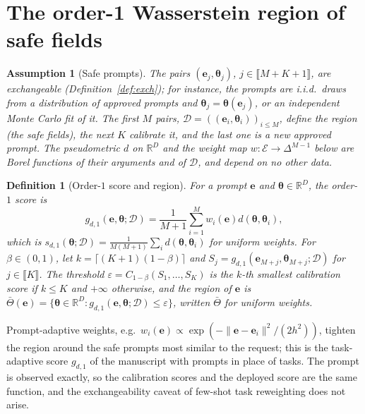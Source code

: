 \documentclass{article}
\newcommand{\RR}{\mathbb{R}}
\newcommand{\cD}{\mathcal{D}}
\newcommand{\cE}{\mathcal{E}}
\newcommand{\bth}{\boldsymbol{\theta}}
\newcommand{\be}{\mathbf{e}}
\newcommand{\Tbar}{\bar{\Theta}}
\theoremstyle{plain}
\newtheorem{definition}[theorem]{Definition}
\newtheorem{assumption}[theorem]{Assumption}
\theoremstyle{remark}
\begin{document}
\section{The order-1 Wasserstein region of safe fields}\label{sec:region}

\begin{assumption}[Safe prompts]\label{as:exch}
The pairs $(\be_j,\bth_j)$, $j\in\llbracket M+K+1\rrbracket$, are exchangeable (Definition~\ref{def:exch}); for instance, the prompts are
i.i.d.\ draws from a distribution of approved prompts and $\bth_j=\bth(\be_j)$, or an independent
Monte Carlo fit of it. The first $M$ pairs, $\cD=((\be_i,\bth_i))_{i\le M}$, define the region (the
\emph{safe fields}), the next $K$ calibrate it, and the last one is a new approved prompt. The
pseudometric $d$ on $\RR^D$ and the weight map $w:\cE\to\Delta^{M-1}$ below are Borel functions of their arguments and of $\cD$,
and depend on no other data.
\end{assumption}

\begin{definition}[Order-$1$ score and region]\label{def:region}
For a prompt $\be$ and $\bth\in\RR^D$, the order-$1$ score is
\[
g_{d,1}(\be,\bth;\cD)=\frac{1}{M+1}\sum_{i=1}^Mw_i(\be)d(\bth,\bth_i),
\]
which is $s_{d,1}(\bth;\cD)=\frac{1}{M(M+1)}\sum_id(\bth,\bth_i)$ for uniform weights. For $\beta\in(0,1)$, let
$k=\lceil(K+1)(1-\beta)\rceil$ and $S_j=g_{d,1}(\be_{M+j},\bth_{M+j};\cD)$ for $j\in\llbracket K\rrbracket$. The
threshold $\varepsilon=C_{1-\beta}(S_1,\dots,S_K)$ is the $k$-th smallest calibration score if $k\le K$ and
$+\infty$ otherwise, and the region of $\be$ is $\Tbar(\be)=\{\bth\in\RR^D:g_{d,1}(\be,\bth;\cD)\le\varepsilon\}$,
written $\Tbar$ for uniform weights.
\end{definition}

Prompt-adaptive weights, e.g.\ $w_i(\be)\propto\exp(-\|\be-\be_i\|^2/(2h^2))$, tighten the region around
the safe prompts most similar to the request; this is the task-adaptive score $g_{d,1}$ of the
manuscript with prompts in place of tasks. The prompt is observed exactly, so the calibration
scores and the deployed score are the same function, and the exchangeability caveat of
few-shot task reweighting does not arise.
\end{document}
